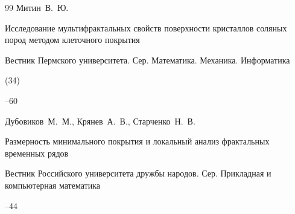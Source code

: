 \begin{thebibliography}{99}
\by Митин~В.~Ю. 

\paper Исследование мультифрактальных свойств поверхности кристаллов соляных пород методом клеточного покрытия 

\jour Вестник Пермского университета. Сер. Математика. Механика. Информатика


(34)

--60
























\by Дубовиков~М.~М., Крянев~А.~В., Старченко~Н.~В.

\paper Размерность минимального покрытия и локальный анализ фрактальных временных рядов 

\jour Вестник Российского университета дружбы народов. Сер. Прикладная и компьютерная математика




--44







\end{thebibliography}
